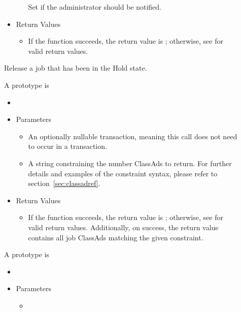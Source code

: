 \begin{description}
\begin{itemize}
\begin{itemize}
      Set if the administrator should be notified.
    \end{itemize}
    \item[] Return Values
    \begin{itemize}
      \item[] If the function succeeds, the return value is ; 
      otherwise, see  for valid return values.
    \end{itemize}
  \end{itemize} 

  Release a job that has been in the Hold state.

\item [\Code{getJobAds}]
  A prototype is 

  \begin{itemize}
    \item[] 
    \item[] Parameters
    \begin{itemize}
      \item[]  

      An optionally nullable transaction, meaning this call does not 
      need to occur in a transaction. 
      \item[]  

      A string constraining the number ClassAds to return. For further details 
      and examples of the constraint syntax, please refer to 
      section~\ref{sec:classadref}.
    \end{itemize}
    \item[] Return Values
    \begin{itemize}
      \item[] If the function succeeds, the return value is ; 
      otherwise, see  for valid return values. Additionally,
      on success, the return value contains all job ClassAds matching the 
      given constraint.
    \end{itemize}
  \end{itemize}     
  
\item [\Code{getJobAd}]
  A prototype is 

  \begin{itemize}
    \item[] 
    \item[] Parameters
    \begin{itemize}
      \item[]  


\end{itemize}
\end{itemize}
\end{description}
